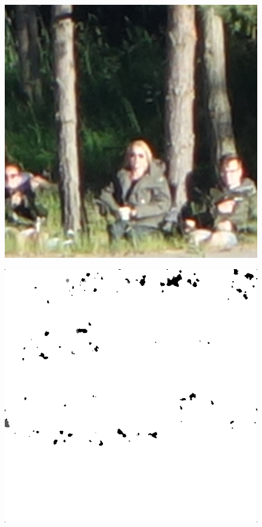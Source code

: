 \begin{figure}[H]
\begin{minipage}[t]{0.3\linewidth}
	\subcaption{}
	\label{fig:hus_org}
\end{minipage}
\begin{minipage}[t]{0.3\linewidth} %
	\includegraphics[width = 1\linewidth]{gfx/sit/sit_org.png}
	\subcaption{}
	\label{fig:sit_org}
\end{minipage}
\begin{minipage}[t]{0.3\linewidth} %
	\includegraphics[width = 1\linewidth]{gfx/car/car_m5.png}

\end{minipage}
\end{figure}

